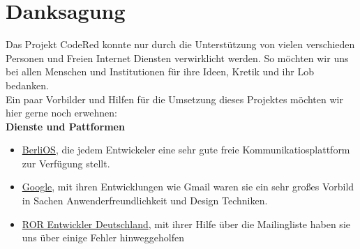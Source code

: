 \chapter{Danksagung}  %
\label{chapter:Danksagung}  %

Das Projekt CodeRed konnte nur durch die Unterstützung von vielen verschieden Personen und Freien Internet Diensten verwirklicht werden. So möchten wir uns bei allen Menschen und Institutionen für ihre Ideen, Kretik und ihr Lob bedanken. \\
Ein paar Vorbilder und Hilfen für die Umsetzung dieses Projektes möchten wir hier gerne noch erwehnen: 
\\
\textbf{Dienste und Pattformen}
\begin{itemize}
\item \href{http://www.berlios.de}{BerliOS}, die jedem Entwickeler eine sehr gute freie Kommunikatiosplattform zur Verfügung stellt.
\item \href{http://www.google.de}{Google}, mit ihren Entwicklungen wie Gmail waren sie ein sehr großes Vorbild in Sachen Anwenderfreundlichkeit und Design Techniken. 
\item \href{http://rubyonrails.de}{ROR Entwickler Deutschland}, mit ihrer Hilfe über die Mailingliste haben sie uns über einige Fehler hinweggeholfen
\end{itemize}